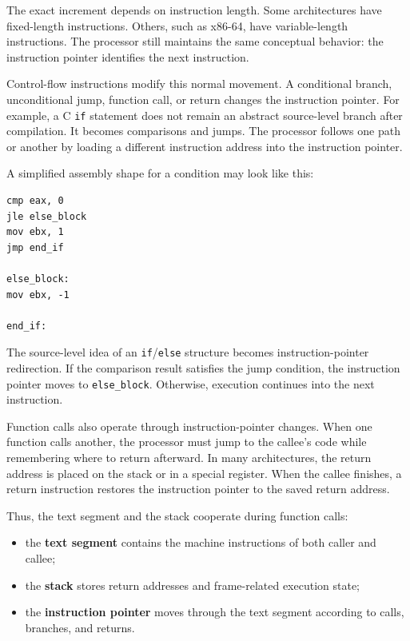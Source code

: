 The exact increment depends on instruction length. Some architectures have fixed-length instructions. Others, such as x86-64, have variable-length instructions. The processor still maintains the same conceptual behavior: the instruction pointer identifies the next instruction.

Control-flow instructions modify this normal movement. A conditional branch, unconditional jump, function call, or return changes the instruction pointer. For example, a C \texttt{if} statement does not remain an abstract source-level branch after compilation. It becomes comparisons and jumps. The processor follows one path or another by loading a different instruction address into the instruction pointer.

A simplified assembly shape for a condition may look like this:

\begin{verbatim}
cmp eax, 0
jle else_block
mov ebx, 1
jmp end_if

else_block:
mov ebx, -1

end_if:
\end{verbatim}

The source-level idea of an \texttt{if}/\texttt{else} structure becomes instruction-pointer redirection. If the comparison result satisfies the jump condition, the instruction pointer moves to \texttt{else\_block}. Otherwise, execution continues into the next instruction.

Function calls also operate through instruction-pointer changes. When one function calls another, the processor must jump to the callee's code while remembering where to return afterward. In many architectures, the return address is placed on the stack or in a special register. When the callee finishes, a return instruction restores the instruction pointer to the saved return address.

Thus, the text segment and the stack cooperate during function calls:

\begin{itemize}
    \item the \textbf{text segment} contains the machine instructions of both caller and callee;
    \item the \textbf{stack} stores return addresses and frame-related execution state;
    \item the \textbf{instruction pointer} moves through the text segment according to calls, branches, and returns.
\end{itemize}

